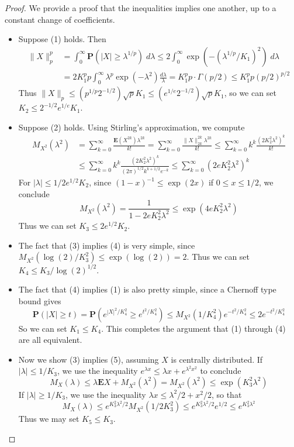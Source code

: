 \begin{proof}
    We provide a proof that the inequalities implies one another, up to a constant change of coefficients. 
    \begin{itemize}
        \item Suppose (1) holds. Then
    \begin{align*}
        \| X \|_p^p &= \int_0^\infty \mathbf{P}(|X| \geq \lambda^{1/p})\; d\lambda \leq 2 \int_0^\infty \exp(-(\lambda^{1/p}/K_1)^2)\; d\lambda\\
        &= 2 K_1^p p \int_0^\infty \lambda^p \exp(-\lambda^2) \frac{d\lambda}{\lambda} = K_1^p p \cdot \Gamma(p/2) \leq K_1^p p (p/2)^{p/2}
    \end{align*}
    Thus $\| X \|_p \leq (p^{1/p} 2^{-1/2}) \sqrt{p} K_1 \leq (e^{1/e} 2^{-1/2}) \sqrt{p} K_1$, so we can set $K_2 \leq 2^{-1/2} e^{1/e} K_1$.

    \item Suppose (2) holds. Using Stirling's approximation, we compute
    \begin{align*}
        M_{X^2}(\lambda^2) &= \sum_{k = 0}^\infty \frac{\mathbf{E}(X^{2k}) \lambda^{2k}}{k!} = \sum_{k = 0}^\infty \frac{\| X \|_{2k}^{2k} \lambda^{2k}}{k!} \leq \sum_{k = 0}^\infty k^k \frac{(2 K_2^2 \lambda^2)^k}{k!}\\
        &\leq \sum_{k = 0}^\infty k^k \frac{(2 K_2^2 \lambda^2)^k}{(2\pi)^{1/2} k^{k + 1/2} e^{-k}} \leq \sum_{k = 0}^\infty (2 e K_2^2 \lambda^2)^k
    \end{align*}
    For $|\lambda| \leq 1/2e^{1/2} K_2$, since $(1-x)^{-1} \leq \exp(2x)$ if $0 \leq x \leq 1/2$, we conclude
    \[ M_{X^2}(\lambda^2) = \frac{1}{1 - 2e K_2^2 \lambda^2} \leq \exp(4e K_2^2 \lambda^2) \]
    Thus we can set $K_3 \leq 2e^{1/2} K_2$.

    \item The fact that (3) implies (4) is very simple, since $M_{X^2}(\log(2)/K_3^2) \leq \exp(\log(2)) = 2$. Thus we can set $K_4 \leq K_3/\log(2)^{1/2}$.

    \item The fact that (4) implies (1) is also pretty simple, since a Chernoff type bound gives
    \[ \mathbf{P}(|X| \geq t) = \mathbf{P}(e^{|X|^2/K_4^2} \geq e^{t^2/K_4^2}) \leq M_{X^2}(1/K_4^2) e^{-t^2/K_4^2} \leq 2e^{-t^2/K_4^2} \]
    So we can set $K_1 \leq K_4$. This completes the argument that (1) through (4) are all equivalent.

    \item Now we show (3) implies (5), assuming $X$ is centrally distributed. If $|\lambda| \leq 1/K_3$, we use the inequality $e^{\lambda x} \leq \lambda x + e^{\lambda^2 x^2}$ to conclude
    \[ M_X(\lambda) \leq \lambda \mathbf{E} X + M_{X^2}(\lambda^2) = M_{X^2}(\lambda^2) \leq \exp(K_3^2 \lambda^2) \]
    If $|\lambda| \geq 1/K_3$, we use the inequality $\lambda x \leq \lambda^2/2 + x^2/2$, so that
    \[ M_X(\lambda) \leq e^{K_3^2 \lambda^2/2} M_{X^2}(1/2 K_3^2) \leq e^{K_3^2 \lambda^2/2} e^{1/2} \leq e^{K_3^2 \lambda^2} \]
    Thus we may set $K_5 \leq K_3$.


\end{itemize}
\end{proof}

